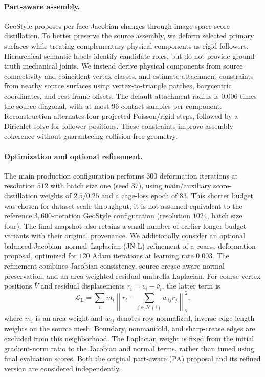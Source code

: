 \begin{appendix}
\paragraph{Part-aware assembly.}
GeoStyle proposes per-face Jacobian changes through image-space score distillation.
To better preserve the source assembly, we deform selected primary surfaces while treating complementary physical components as rigid followers.
Hierarchical semantic labels identify candidate roles, but do not provide ground-truth mechanical joints.
We instead derive physical components from source connectivity and coincident-vertex classes, and estimate attachment constraints from nearby source surfaces using vertex-to-triangle patches, barycentric coordinates, and rest-frame offsets.
The default attachment radius is $0.006$ times the source diagonal, with at most $96$ contact samples per component.
Reconstruction alternates four projected Poisson/rigid steps, followed by a Dirichlet solve for follower positions.
These constraints improve assembly coherence without guaranteeing collision-free geometry.

\paragraph{Optimization and optional refinement.}
The main production configuration performs $300$ deformation iterations at resolution $512$ with batch size one (seed $37$), using main/auxiliary score-distillation weights of $2.5/0.25$ and a cage-loss epoch of $83$.
This shorter budget was chosen for dataset-scale throughput; it is not assumed equivalent to the reference $3{,}600$-iteration GeoStyle configuration (resolution $1024$, batch size four).
The final snapshot also retains a small number of earlier longer-budget variants with their original provenance.
We additionally consider an optional balanced Jacobian--normal--Laplacian (JN-L) refinement of a coarse deformation proposal, optimized for $120$ Adam iterations at learning rate $0.003$.
The refinement combines Jacobian consistency, source-crease-aware normal preservation, and an area-weighted residual umbrella Laplacian.
For coarse vertex positions $\bar V$ and residual displacements $r_i=v_i-\bar v_i$, the latter term is
\begin{equation}
    \mathcal{L}_{\mathrm{L}} =
    \sum_i m_i\left\|r_i-\sum_{j\in\mathcal{N}(i)}w_{ij}r_j\right\|_2^2,
    \label{eq:supp_deformnext_laplacian}
\end{equation}
where $m_i$ is an area weight and $w_{ij}$ denotes row-normalized, inverse-edge-length weights on the source mesh.
Boundary, nonmanifold, and sharp-crease edges are excluded from this neighborhood.
The Laplacian weight is fixed from the initial gradient-norm ratio to the Jacobian and normal terms, rather than tuned using final evaluation scores.
Both the original part-aware (PA) proposal and its refined version are considered independently.


\end{appendix}
